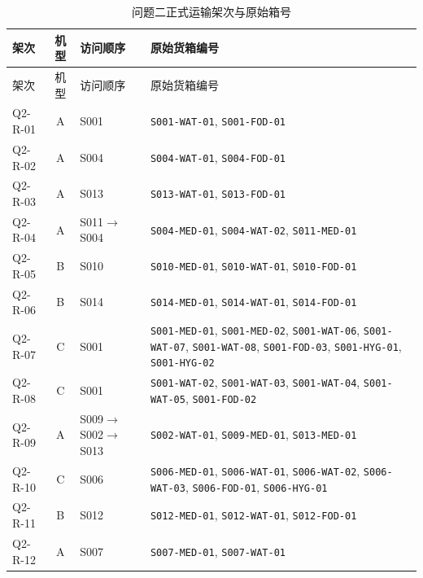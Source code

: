 \documentclass[withoutpreface,colorprint]{format}
\numberwithin{equation}{section}
\numberwithin{figure}{section}
\numberwithin{table}{section}
\begin{document}
\begin{longtable}{@{}lc>{\raggedright\arraybackslash}p{2.8cm}>{\raggedright\arraybackslash}p{8.8cm}@{}}
\caption{问题二正式运输架次与原始箱号}\label{tab:app_q2_boxes}\\
\toprule
架次 & 机型 & 访问顺序 & 原始货箱编号\\
\midrule
\endfirsthead
\toprule
架次 & 机型 & 访问顺序 & 原始货箱编号\\
\midrule
\endhead
Q2-R-01 & A & S001 & \texttt{S001-WAT-01}\allowbreak, \texttt{S001-FOD-01}\allowbreak\\
Q2-R-02 & A & S004 & \texttt{S004-WAT-01}\allowbreak, \texttt{S004-FOD-01}\allowbreak\\
Q2-R-03 & A & S013 & \texttt{S013-WAT-01}\allowbreak, \texttt{S013-FOD-01}\allowbreak\\
Q2-R-04 & A & S011$\to$S004 & \texttt{S004-MED-01}\allowbreak, \texttt{S004-WAT-02}\allowbreak, \texttt{S011-MED-01}\allowbreak\\
Q2-R-05 & B & S010 & \texttt{S010-MED-01}\allowbreak, \texttt{S010-WAT-01}\allowbreak, \texttt{S010-FOD-01}\allowbreak\\
Q2-R-06 & B & S014 & \texttt{S014-MED-01}\allowbreak, \texttt{S014-WAT-01}\allowbreak, \texttt{S014-FOD-01}\allowbreak\\
Q2-R-07 & C & S001 & \texttt{S001-MED-01}\allowbreak, \texttt{S001-MED-02}\allowbreak, \texttt{S001-WAT-06}\allowbreak, \texttt{S001-WAT-07}\allowbreak, \texttt{S001-WAT-08}\allowbreak, \texttt{S001-FOD-03}\allowbreak, \texttt{S001-HYG-01}\allowbreak, \texttt{S001-HYG-02}\allowbreak\\
Q2-R-08 & C & S001 & \texttt{S001-WAT-02}\allowbreak, \texttt{S001-WAT-03}\allowbreak, \texttt{S001-WAT-04}\allowbreak, \texttt{S001-WAT-05}\allowbreak, \texttt{S001-FOD-02}\allowbreak\\
Q2-R-09 & A & S009$\to$S002$\to$S013 & \texttt{S002-WAT-01}\allowbreak, \texttt{S009-MED-01}\allowbreak, \texttt{S013-MED-01}\allowbreak\\
Q2-R-10 & C & S006 & \texttt{S006-MED-01}\allowbreak, \texttt{S006-WAT-01}\allowbreak, \texttt{S006-WAT-02}\allowbreak, \texttt{S006-WAT-03}\allowbreak, \texttt{S006-FOD-01}\allowbreak, \texttt{S006-HYG-01}\allowbreak\\
Q2-R-11 & B & S012 & \texttt{S012-MED-01}\allowbreak, \texttt{S012-WAT-01}\allowbreak, \texttt{S012-FOD-01}\allowbreak\\
Q2-R-12 & A & S007 & \texttt{S007-MED-01}\allowbreak, \texttt{S007-WAT-01}\allowbreak\\

\end{longtable}
\end{document}
